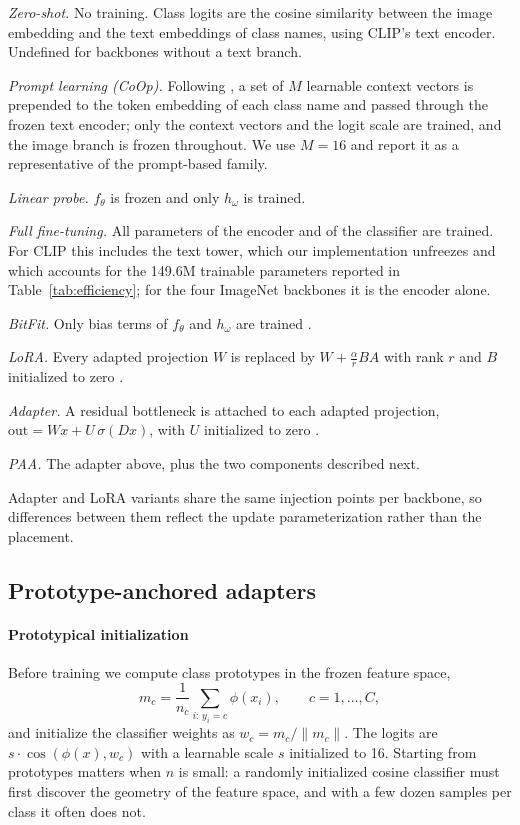 \documentclass[preprint,12pt]{elsarticle}
\newcommand{\ours}{\textsc{PAA}}
\begin{document}
\emph{Zero-shot.} No training. Class logits are the cosine similarity between the
image embedding and the text embeddings of class names, using CLIP's text
encoder. Undefined for backbones without a text branch.

\emph{Prompt learning (CoOp).} Following \cite{zhou2022coop}, a set of $M$
learnable context vectors is prepended to the token embedding of each class name
and passed through the frozen text encoder; only the context vectors and the
logit scale are trained, and the image branch is frozen throughout. We use
$M=16$ and report it as a representative of the prompt-based family.

\emph{Linear probe.} $f_\theta$ is frozen and only $h_\omega$ is trained.

\emph{Full fine-tuning.} All parameters of the encoder and of the classifier are
trained. For CLIP this includes the text tower, which our implementation
unfreezes and which accounts for the 149.6M trainable parameters reported in
Table~\ref{tab:efficiency}; for the four ImageNet backbones it is the encoder
alone.

\emph{BitFit.} Only bias terms of $f_\theta$ and $h_\omega$ are trained
\cite{benzaken2022bitfit}.

\emph{LoRA.} Every adapted projection $W$ is replaced by
$W + \tfrac{\alpha}{r}BA$ with rank $r$ and $B$ initialized to zero
\cite{hu2022lora}.

\emph{Adapter.} A residual bottleneck is attached to each adapted projection,
$\mathrm{out} = Wx + U\,\sigma(Dx)$, with $U$ initialized to zero
\cite{houlsby2019adapter}.

\emph{\ours.} The adapter above, plus the two components described next.

Adapter and LoRA variants share the same injection points per backbone, so
differences between them reflect the update parameterization rather than the
placement.

\subsection{Prototype-anchored adapters}

\paragraph{Prototypical initialization}
Before training we compute class prototypes in the frozen feature space,
\begin{equation}
m_c = \frac{1}{n_c}\sum_{i:\,y_i=c} \phi(x_i),
\qquad c = 1,\dots,C,
\end{equation}
and initialize the classifier weights as $w_c = m_c/\lVert m_c\rVert$. The
logits are $s\cdot\cos(\phi(x), w_c)$ with a learnable scale $s$ initialized to
16. Starting from prototypes matters when $n$ is small: a randomly initialized
cosine classifier must first discover the geometry of the feature space, and
with a few dozen samples per class it often does not.
\end{document}

